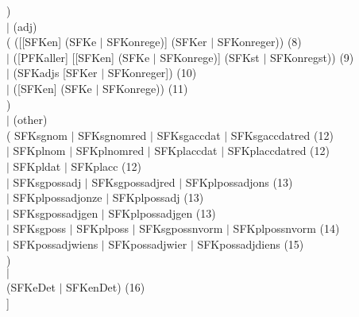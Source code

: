 \begin{tabbing}
) \>   \>                                                             \>    
 \\
$\mid$  \>   \>                                                             
\> (adj)\\
( \>   \> ([[SFKen] (SFKe $\mid$  SFKonrege)]  (SFKer $\mid$  SFKonreger)) 
       \> (8) \\
  \> $\mid$  \> ([PFKaller] [[SFKen] (SFKe $\mid$  SFKonrege)] (SFKst 
$\mid$  SFKonregst))
 \> (9) \\
  \> $\mid$  \> (SFKadjs  [SFKer $\mid$  SFKonreger])                     
       \> (10) \\ 
  \> $\mid$  \> ([SFKen]  (SFKe $\mid$  SFKonrege))                       
       \> (11) \\
) \>   \>                                                            
\>      \\
$\mid$  \>   \>                                                       
    \> (other)\\
( \>   \> SFKsgnom $\mid$  SFKsgnomred $\mid$  SFKsgaccdat $\mid$  SFKsgaccdatred  
    \> (12) \\
  \>   \> $\mid$  SFKplnom $\mid$  SFKplnomred $\mid$  SFKplaccdat 
$\mid$  SFKplaccdatred    \> (12) \\
  \>   \> $\mid$  SFKpldat $\mid$  SFKplacc                             
         \> (12) \\
  \>   \> $\mid$  SFKsgpossadj $\mid$  SFKsgpossadjred $\mid$  SFKplpossadjons   
      \> (13) \\
  \>   \> $\mid$  SFKplpossadjonze $\mid$  SFKplpossadj                   
       \> (13) \\
  \>   \> $\mid$  SFKsgpossadjgen $\mid$  SFKplpossadjgen                 
       \> (13) \\
  \>   \> $\mid$  SFKsgposs $\mid$  SFKplposs $\mid$  SFKsgpossnvorm 
$\mid$  SFKplpossnvorm  \> (14) \\
  \>   \> $\mid$  SFKpossadjwiens $\mid$  SFKpossadjwier $\mid$  SFKpossadjdiens  
     \> (15) \\
) \>   \>                                                            \>      \\
$\mid$  \>   \>                                                      
      \>      \\
  \>   \> (SFKeDet $\mid$  SFKenDet)                                
       \> (16) \\
] \>   \>                                                         
   \>      \\
\end{tabbing}

